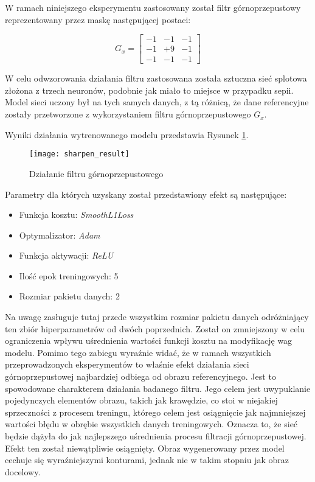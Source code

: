     W ramach niniejszego eksperymentu zastosowany został filtr górnoprzepustowy
    reprezentowany przez maskę następującej postaci:

    \[G_x =
    \begin{bmatrix}
    -1 & -1 & -1 \\
    -1 & +9 & -1 \\
    -1 & -1 & -1
    \end{bmatrix}
    \]

    W celu odwzorowania działania filtru zastosowana została sztuczna sieć
    splotowa złożona z trzech neuronów, podobnie jak miało to miejsce w przypadku
    sepii. Model sieci uczony był na tych samych danych, z tą różnicą, że dane
    referencyjne zostały przetworzone z wykorzystaniem filtru górnoprzepustowego
    $G_x$.

    Wyniki działania wytrenowanego modelu przedstawia Rysunek \ref{fig:sharpen_result}.

    \begin{figure}[H]
      \centering
      \texttt{[image: sharpen\_result]}
      \caption[Działanie filtru górnoprzepustowego - źródło: Rysunek własny]{Działanie filtru górnoprzepustowego}
      \label{fig:sharpen_result}
    \end{figure}

    Parametry dla których uzyskany został przedstawiony efekt są następujące:

    \begin{itemize}
    \item Funkcja kosztu: \textit{SmoothL1Loss}
    \item Optymalizator: \textit{Adam}
    \item Funkcja aktywacji: \textit{ReLU}
    \item Ilość epok treningowych: 5
    \item Rozmiar pakietu danych: 2
    \end{itemize}

    Na uwagę zasługuje tutaj przede wszystkim rozmiar pakietu danych odróżniający
    ten zbiór hiperparametrów od dwóch poprzednich. Został on zmniejszony w celu
    ograniczenia wpływu uśrednienia wartości funkcji kosztu na modyfikację wag
    modelu. Pomimo tego zabiegu wyraźnie widać, że w ramach wszystkich przeprowadzonych
    eksperymentów to właśnie efekt działania sieci górnoprzepustowej najbardziej
    odbiega od obrazu referencyjnego. Jest to spowodowane charakterem działania
    badanego filtru. Jego celem jest uwypuklanie pojedynczych elementów obrazu, takich
    jak krawędzie, co stoi w niejakiej sprzeczności z procesem treningu, którego celem
    jest osiągnięcie jak najmniejszej wartości błędu w obrębie wszystkich danych
    treningowych. Oznacza to, że sieć będzie dążyła do jak najlepszego uśrednienia
    procesu filtracji górnoprzepustowej. Efekt ten został niewątpliwie osiągnięty.
    Obraz wygenerowany przez model cechuje się wyraźniejszymi konturami, jednak
    nie w takim stopniu jak obraz docelowy.

